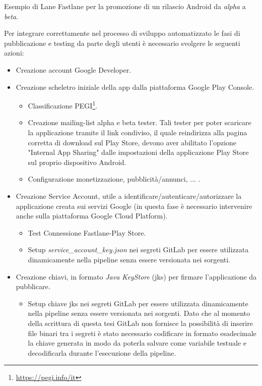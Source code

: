 \begin{listing}[H]
\inputminted{ruby}{code/4-gpc-promote}
\caption{Esempio di Lane Fastlane per la promozione di un rilascio Android da \textit{alpha} a \textit{beta}.}
\end{listing}

Per integrare correttamente nel processo di sviluppo automatizzato le fasi di pubblicazione e testing da parte degli utenti è necessario svolgere le seguenti azioni:
\begin{itemize}
    \item Creazione account Google Developer.
    \item Creazione scheletro iniziale della app dalla piattaforma Google Play Console.
    \begin{itemize}
        \item Classificazione PEGI\footnote{\url{https://pegi.info/it}}.
        \item Creazione mailing-list alpha e beta tester. Tali tester per poter scaricare la applicazione tramite il link condiviso, il quale reindirizza alla pagina corretta di download sul Play Store, devono aver abilitato l'opzione "Internal App Sharing" dalle impostazioni della applicazione Play Store sul proprio dispositivo Android.
        \item Configurazione monetizzazione, pubblicità/annunci, ... .
    \end{itemize}
    \item Creazione Service Account, utile a identificare/autenticare/autorizzare la applicazione creata sui servizi Google (in questa fase è necessario intervenire anche sulla piattaforma Google Cloud Platform).
    \begin{itemize}
        \item Test Connessione Fastlane-Play Store.
        \item Setup \textit{service\_account\_key.json} nei segreti GitLab per essere utilizzata dinamicamente nella pipeline senza essere versionata nei sorgenti.
    \end{itemize}
    \item Creazione chiavi, in formato \textit{Java KeyStore} (jks) per firmare l'applicazione da pubblicare.
    \begin{itemize}
        \item Setup chiave jks nei segreti GitLab per essere utilizzata dinamicamente nella pipeline senza essere versionata nei sorgenti. Dato che al momento della scrittura di questa tesi GitLab non fornisce la possibilità di inserire file binari tra i segreti è stato necessario codificare in formato esadecimale la chiave generata in modo da poterla salvare come variabile testuale e decodificarla durante l'esecuzione della pipeline\cite{gitlabciandroid}.

\end{itemize}
\end{itemize}
